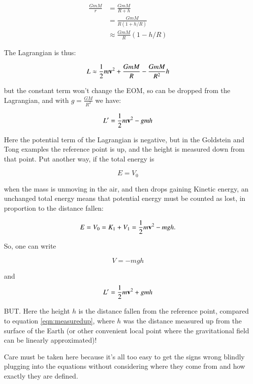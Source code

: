 \begin{align*}
\frac{GmM}{r} 
&= \frac{GmM}{R + h} \\
&= \frac{GmM}{R(1 + h/R)} \\
&\approx \frac{GmM}{R} (1 - h/R)
\end{align*}

The Lagrangian is thus:

\begin{equation*}
L \approx \frac{1}{2} m \mathbf{v}^2 + \frac{GmM}{R} -\frac{GmM}{R^2} h
\end{equation*}

but the constant term won't change the EOM, so can be dropped from the Lagrangian, and with $g=\frac{GM}{R^2}$ we have:

\begin{equation}\label{eqn:measuredup}
L' = \frac{1}{2} m \mathbf{v}^2 - g m h
\end{equation}

Here the potential term of the Lagrangian is negative, but in the Goldstein and Tong examples the reference point is up, and the height is measured down
from that point.  Put another way, if the total energy is 

\begin{equation*}
E = V_0
\end{equation*}

when the mass is unmoving in the air, and then drops gaining Kinetic energy, an unchanged total energy means that potential energy must be counted as lost, in proportion to the distance fallen:

\begin{equation*}
E = V_0 = K_1 + V_1 = \frac{1}{2} m \mathbf{v}^2 - m g h.
\end{equation*}

So, one can write

\begin{equation*}
V = -m g h
\end{equation*}

and 
\begin{equation}\label{eqn:measureddown}
L' = \frac{1}{2} m \mathbf{v}^2 + g m h
\end{equation}

BUT.  Here the height $h$ is the distance fallen from the reference point, compared to equation \ref{eqn:measuredup}, where $h$ was the distance measured up from the surface of the Earth (or other convenient local point where the gravitational field can be linearly approximated)!

Care must be taken here because it's all too easy to get the signs wrong blindly plugging into the equations without considering where they come from and how exactly they are defined.

%               
